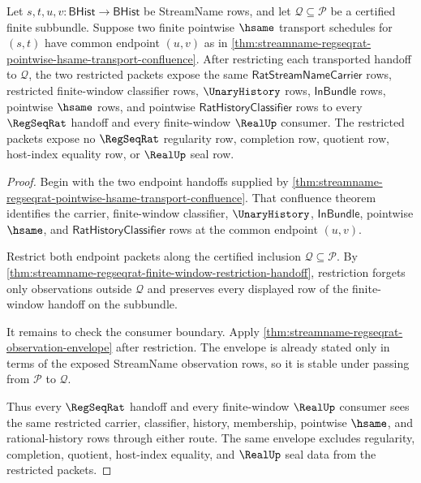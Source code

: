 \begin{theorem}
\label{thm:streamname-regseqrat-pointwise-restricted-transport-confluence}
Let $s,t,u,v:\mathsf{BHist}\to\mathsf{BHist}$ be StreamName rows, and let
$\mathcal Q\subseteq\mathcal P$ be a certified finite subbundle. Suppose two
finite pointwise $\hsame$ transport schedules for $(s,t)$ have common endpoint
$(u,v)$ as in
\autoref{thm:streamname-regseqrat-pointwise-hsame-transport-confluence}. After
restricting each transported handoff to $\mathcal Q$, the two restricted packets
expose the same $\mathsf{RatStreamNameCarrier}$ rows, restricted finite-window
classifier rows, $\UnaryHistory$ rows, $\mathsf{InBundle}$ rows, pointwise
$\hsame$ rows, and pointwise $\mathsf{RatHistoryClassifier}$ rows to every
$\RegSeqRat$ handoff and every finite-window $\RealUp$ consumer. The restricted
packets expose no $\RegSeqRat$ regularity row, completion row, quotient row,
host-index equality row, or $\RealUp$ seal row.
\end{theorem}
\begin{proof}
Begin with the two endpoint handoffs supplied by
\autoref{thm:streamname-regseqrat-pointwise-hsame-transport-confluence}. That
confluence theorem identifies the carrier, finite-window classifier,
$\UnaryHistory$, $\mathsf{InBundle}$, pointwise $\hsame$, and
$\mathsf{RatHistoryClassifier}$ rows at the common endpoint $(u,v)$.

Restrict both endpoint packets along the certified inclusion
$\mathcal Q\subseteq\mathcal P$. By
\autoref{thm:streamname-regseqrat-finite-window-restriction-handoff}, restriction
forgets only observations outside $\mathcal Q$ and preserves every displayed row
of the finite-window handoff on the subbundle.

It remains to check the consumer boundary. Apply
\autoref{thm:streamname-regseqrat-observation-envelope} after restriction. The
envelope is already stated only in terms of the exposed StreamName observation
rows, so it is stable under passing from $\mathcal P$ to $\mathcal Q$.

Thus every $\RegSeqRat$ handoff and every finite-window $\RealUp$ consumer sees
the same restricted carrier, classifier, history, membership, pointwise
$\hsame$, and rational-history rows through either route. The same envelope
excludes regularity, completion, quotient, host-index equality, and $\RealUp$
seal data from the restricted packets.
\end{proof}
